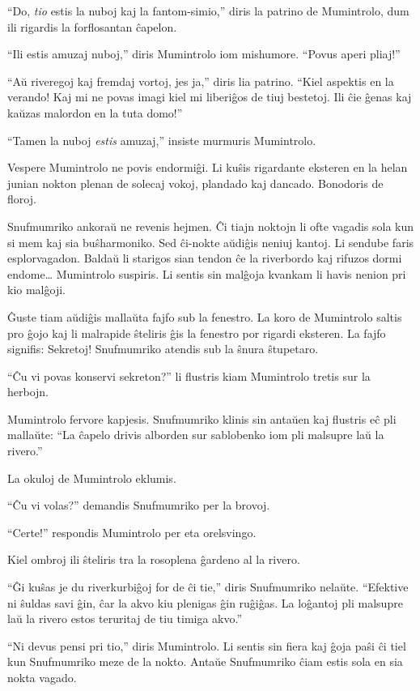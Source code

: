 ``Do, \emph{tio} estis la nuboj kaj la fantom-simio,'' diris la patrino de Mumintrolo, dum ili rigardis la forflosantan ĉapelon.

``Ili estis amuzaj nuboj,'' diris Mumintrolo iom mishumore. ``Povus aperi pliaj!''

``Aŭ riveregoj kaj fremdaj vortoj, jes ja,'' diris lia patrino. ``Kiel aspektis en la verando! Kaj mi ne povas imagi kiel mi liberiĝos de tiuj bestetoj. Ili ĉie ĝenas kaj kaŭzas malordon en la tuta domo!''

``Tamen la nuboj \emph{estis} amuzaj,'' insiste murmuris Mumintrolo.

Vespere Mumintrolo ne povis endormiĝi. Li kuŝis rigardante eksteren en la helan junian nokton plenan de solecaj vokoj, plandado kaj dancado. Bonodoris de floroj.

Snufmumriko ankoraŭ ne revenis hejmen. Ĉi tiajn noktojn li ofte vagadis sola kun si mem kaj sia buŝharmoniko. Sed ĉi-nokte aŭdiĝis neniuj kantoj. Li sendube faris esplorvagadon. Baldaŭ li starigos sian tendon ĉe la riverbordo kaj rifuzos dormi endome{\ldots} Mumintrolo suspiris. Li sentis sin malĝoja kvankam li havis nenion pri kio malĝoji.

Ĝuste tiam aŭdiĝis mallaŭta fajfo sub la fenestro. La koro de Mumintrolo saltis pro ĝojo kaj li malrapide ŝteliris ĝis la fenestro por rigardi eksteren. La fajfo signifis: Sekretoj! Snufmumriko atendis sub la ŝnura ŝtupetaro.

``Ĉu vi povas konservi sekreton?'' li flustris kiam Mumintrolo tretis sur la herbojn.

Mumintrolo fervore kapjesis. Snufmumriko klinis sin antaŭen kaj flustris eĉ pli mallaŭte: ``La ĉapelo drivis alborden sur sablobenko iom pli malsupre laŭ la rivero.''

La okuloj de Mumintrolo eklumis.

``Ĉu vi volas?'' demandis Snufmumriko per la brovoj.

``Certe!'' respondis Mumintrolo per eta orelsvingo.

Kiel ombroj ili ŝteliris tra la rosoplena ĝardeno al la rivero.

``Ĝi kuŝas je du riverkurbiĝoj for de ĉi tie,'' diris Snufmumriko nelaŭte. ``Efektive ni ŝuldas savi ĝin, ĉar la akvo kiu plenigas ĝin ruĝiĝas. La loĝantoj pli malsupre laŭ la rivero estos teruritaj de tiu timiga akvo.''

``Ni devus pensi pri tio,'' diris Mumintrolo. Li sentis sin fiera kaj ĝoja paŝi ĉi tiel kun Snufmumriko meze de la nokto. Antaŭe Snufmumriko ĉiam estis sola en sia nokta vagado.


